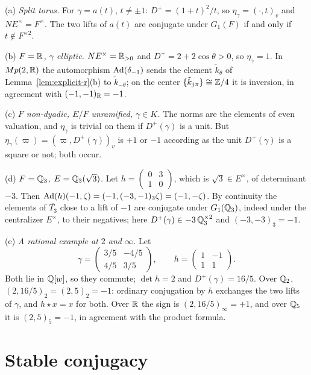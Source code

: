 \begin{example}\label{ex:eta}
(a) \emph{Split torus.} For $\gamma=a(t)$, $t\ne\pm1$:
$D^+=(1+t)^2/t$, so $\eta_\gamma=(\cdot,t)_v$ and $N E^\times=F^\times$.
The two lifts of $a(t)$ are conjugate under $G_1(F)$ if and only if
$t\notin F^{\times2}$.

(b) \emph{$F=\mathbb{R}$, $\gamma$ elliptic.} $N E^\times=\mathbb{R}_{>0}$ and
$D^+=2+2\cos\theta>0$, so $\eta_\gamma=1$. In $Mp(2,\mathbb{R})$ the automorphism
$\operatorname{Ad}(\delta_{-1})$ sends the element $\tilde k_\theta$ of
Lemma~\ref{lem:explicit-r}(b) to $\tilde k_{-\theta}$; on the center
$\{\tilde k_{j\pi}\}\cong\mathbb{Z}/4$ it is inversion, in agreement with
$(-1,-1)_{\mathbb{R}}=-1$.

(c) \emph{$F$ non-dyadic, $E/F$ unramified, $\gamma\in K$.} The norms are
the elements of even valuation, and $\eta_\gamma$ is trivial on them if
$D^+(\gamma)$ is a unit. But $\eta_\gamma(\varpi)=(\varpi,D^+(\gamma))_v$
is $+1$ or $-1$ according as the unit $D^+(\gamma)$ is a square or not;
both occur.

(d) \emph{$F=\mathbb{Q}_3$, $E=\mathbb{Q}_3(\sqrt3)$.} Let $h=\begin{pmatrix}0&3\\1&0
\end{pmatrix}$, which is $\sqrt3\in E^\times$, of determinant $-3$. Then
$\operatorname{Ad}(h)(-1,\zeta)=(-1,(-3,-1)_3\zeta)=(-1,-\zeta)$. By continuity
the elements of $\overline{T_3}$ close to a lift of $-1$ are conjugate
under $G_1(\mathbb{Q}_3)$, indeed under the centralizer $E^\times$, to their
negatives; here $D^+(\gamma)\in-3\,\mathbb{Q}_3^{\times2}$ and
$(-3,-3)_3=-1$.

(e) \emph{A rational example at $2$ and $\infty$.} Let
\[
\gamma=\begin{pmatrix}3/5&-4/5\\4/5&3/5\end{pmatrix},\qquad
h=\begin{pmatrix}1&-1\\1&1\end{pmatrix}.
\]
Both lie in $\mathbb{Q}[w]$, so they commute; $\det h=2$ and $D^+(\gamma)=16/5$.
Over $\mathbb{Q}_2$, $(2,16/5)_2=(2,5)_2=-1$: ordinary conjugation by $h$ exchanges
the two lifts of $\gamma$, and $h\star x=x$ for both. Over $\mathbb{R}$ the sign is
$(2,16/5)_\infty=+1$, and over $\mathbb{Q}_5$ it is $(2,5)_5=-1$, in agreement with
the product formula.
\end{example}

\section{Stable conjugacy}\label{sec:stable-conj}

